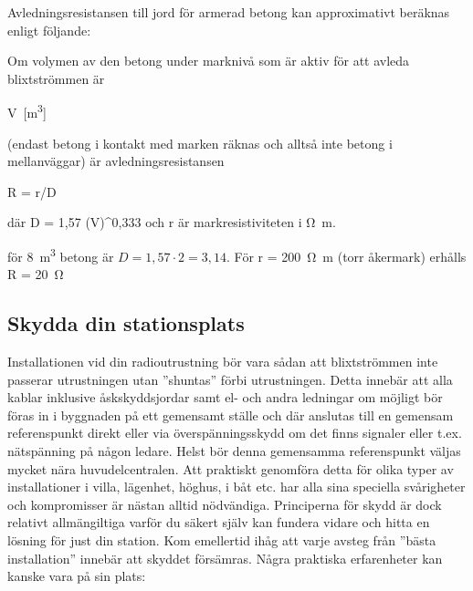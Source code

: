 Avledningsresistansen till jord för armerad betong kan approximativt beräknas
enligt följande:

\begin{exempelbox}
Om volymen av den betong under marknivå som är aktiv för att avleda
blixtströmmen är 

V~[\unit{\cubic\metre}]

(endast betong i kontakt med marken räknas och alltså inte betong i mellanväggar)
är avledningsresistansen

R = r/D

där D = 1,57 (V)^{0,333} och r är markresistiviteten i \unit{\ohm\metre}.

för \qty{8}{\cubic\metre} betong är \(D = 1,57 \cdot 2 = 3,14\).
För r = \qty{200}{\ohm\metre} (torr åkermark) erhålls R = \qty{20}{\ohm}
\end{exempelbox}

\subsection{Skydda din stationsplats}
Installationen vid din radioutrustning bör vara sådan att blixtströmmen inte
passerar utrustningen utan ''shuntas'' förbi utrustningen.
Detta innebär att alla kablar inklusive åskskyddsjordar samt el- och andra
ledningar om möjligt bör föras in i byggnaden på ett gemensamt ställe och där
anslutas till en gemensam referenspunkt direkt eller via överspänningsskydd om
det finns signaler eller t.ex. nätspänning på någon ledare.
Helst bör denna gemensamma referenspunkt väljas mycket nära huvudelcentralen.
Att praktiskt genomföra detta för olika typer av installationer i villa,
lägenhet, höghus, i båt etc. har alla sina speciella svårigheter och
kompromisser är nästan alltid nödvändiga.
Principerna för skydd är dock relativt allmängiltiga varför du säkert själv kan
fundera vidare och hitta en lösning för just din station.
Kom emellertid ihåg att varje avsteg från ''bästa installation'' innebär att
skyddet försämras.
Några praktiska erfarenheter kan kanske vara på sin plats:

